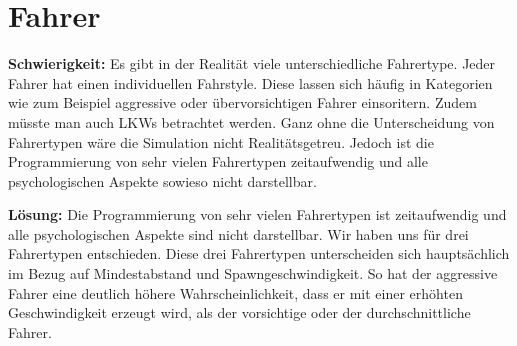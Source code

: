 \section{Fahrer}
\textbf{Schwierigkeit:} Es gibt in der Realität viele unterschiedliche Fahrertype. Jeder Fahrer hat einen individuellen Fahrstyle. Diese lassen sich häufig in Kategorien wie zum Beispiel aggressive oder übervorsichtigen Fahrer einsoritern. Zudem müsste man auch LKWs betrachtet werden. Ganz ohne die Unterscheidung von Fahrertypen wäre die Simulation nicht Realitätsgetreu. Jedoch ist die Programmierung von sehr vielen Fahrertypen zeitaufwendig und alle psychologischen Aspekte sowieso nicht darstellbar.
\begin{addmargin}[25pt]{0pt}
	\item \textbf{Lösung:} Die Programmierung von sehr vielen Fahrertypen ist zeitaufwendig und alle psychologischen Aspekte sind nicht darstellbar. Wir haben uns für drei Fahrertypen entschieden. Diese drei Fahrertypen unterscheiden sich hauptsächlich im Bezug auf Mindestabstand und Spawngeschwindigkeit. So hat der aggressive Fahrer eine deutlich höhere Wahrscheinlichkeit, dass er mit einer erhöhten Geschwindigkeit erzeugt wird, als der vorsichtige oder der durchschnittliche Fahrer.\\
\end{addmargin}